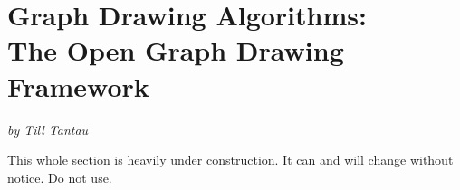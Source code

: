 %
%
%

\section[Graph Drawing Algorithms: The Open Graph Drawing Framework]{Graph Drawing Algorithms:\\ The Open Graph Drawing Framework}

{\emph{by Till Tantau}}

This whole section is heavily under construction. It can and will
change without notice. Do not use.

\endinput


\includeluadocumentationof{pgf.gd.ogdf.library}

\includeluadocumentationof{pgf.gd.ogdf.layered.SugiyamaLayout}
\includeluadocumentationof{pgf.gd.ogdf.layered.TwoLayerCrossMin}
\includeluadocumentationof{pgf.gd.ogdf.layered.RankingModule}
\includeluadocumentationof{pgf.gd.ogdf.layered.AcyclicSubgraphModule}

\includeluadocumentationof{pgf.gd.ogdf.misclayout.CircularLayout}
\includeluadocumentationof{pgf.gd.ogdf.misclayout.BalloonLayout}

\includeluadocumentationof{pgf.gd.ogdf.energybased.FMMMLayout}

\includeluadocumentationof{pgf.gd.ogdf.planarity.PlanarizationLayout}
\includeluadocumentationof{pgf.gd.ogdf.planarity.LayoutPlanRepModule}


